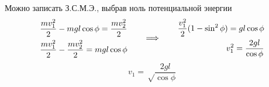 \documentclass[a5paper,10pt]{article}
\begin{document}
Можно записать З.С.М.Э., выбрав ноль потенциальной энергии
\begin{equation*}
\xdef\mv{\frac{mv_1^2}{2}}%
\xdef\mvv{\frac{mv_2^2}{2}}%
	\begin{aligned}[c]
        \mv-mgl\cos{\phi}=\mvv\\
        \mv-\mvv=mgl\cos{\phi}\\
	\end{aligned}
		\qquad\Longrightarrow\qquad
	\begin{aligned}[c]
        \frac{v_1^2}{2}(1-\sin^2\phi)=gl\cos\phi\\
        v_1^2=\frac{2gl}{\cos\phi}
	\end{aligned}
\end{equation*}
\begin{equation*}
    v_1=\sqrt\frac{2gl}{\cos\phi}
\end{equation*}
\end{document}
